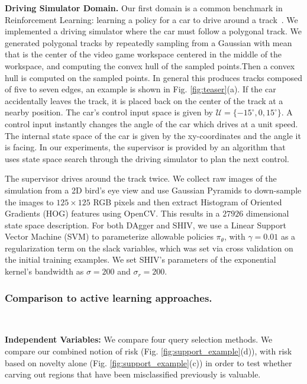 \documentclass[10pt, conference]{ieeeconf}      %
\newcommand{\acro}{SHIV}
\begin{document}
\noindent\textbf{Driving Simulator Domain.}
Our first domain is a common benchmark in Reinforcement Learning: learning a policy for a car to drive around a track~\cite{argall2009survey,ross2010efficient,ross2011reduction}. We implemented a driving simulator where the car must follow a polygonal track. We generated polygonal tracks by repeatedly sampling from a Gaussian with mean that is the center of the video game workspace centered in the middle of the workspace, and computing the convex hull of the sampled points.Then a convex hull is computed on the sampled points. In general this produces tracks composed of five to seven edges, an example is shown in Fig. \ref{fig:teaser}(a). If the car accidentally leaves the track, it is placed
back on the center of the track at a nearby position. The car's control input space is given by  $\mathcal{U} = \lbrace
-15^\circ, 0, 15^\circ \rbrace$. A control input instantly changes the angle of the car which drives at a unit speed. 
The internal state space of the car is given by the
xy-coordinates and the angle it is facing. In our experiments, the supervisor is provided by an algorithm that uses
state space search through the driving simulator to plan the next control.

The supervisor drives around the track twice. We collect raw images of the simulation from a 2D bird's eye view
and use Gaussian Pyramids to down-sample the images to $125 \times 125$ RGB pixels and then extract Histogram of
Oriented Gradients (HOG) features using OpenCV. This results in a $27926$ dimensional state space description.
For both DAgger and \acro, we use a Linear Support Vector Machine (SVM) to parameterize allowable
policies $\pi_{\theta}$, with $\gamma=0.01$ as a regularization term on the slack variables, which was set via cross
validation on the initial training examples. We set SHIV's parameters  of the exponential kernel's bandwidth as $\sigma = 200$ and $\sigma_r = 200$.




\subsubsection{Comparison to active learning approaches.}\

\noindent\textbf{Independent Variables:} We compare four query selection methods. We compare our combined notion of risk (Fig. \ref{fig:support_example}(d)), with risk based on novelty alone (Fig. \ref{fig:support_example}(c)) in order to test whether carving out regions that have been misclassified previously is valuable. 
\end{document}
